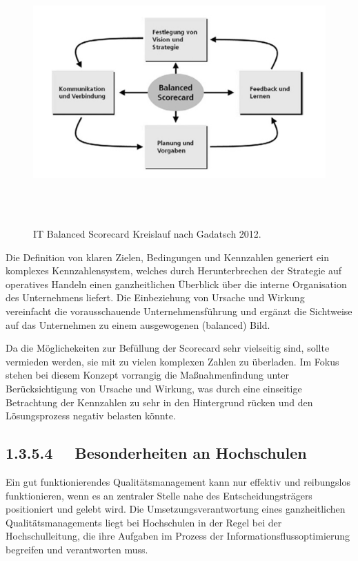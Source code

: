 \documentclass[a4paper]{article}
\begin{document}
\begin{figure}
\centering
\includegraphics[width=15.502cm,height=10.145cm]{miriamkapitel135136-img/miriamkapitel135136-img002.jpg}
\caption[IT Balanced Scorecard Kreislauf nach Gadatsch 2012.]{IT Balanced Scorecard Kreislauf nach Gadatsch 2012.}

\end{figure}
{\sffamily
Die Definition von klaren Zielen, Bedingungen und Kennzahlen generiert ein komplexes Kennzahlensystem, welches durch
Herunterbrechen der Strategie auf operatives Handeln einen ganzheitlichen Überblick über die interne Organisation des
Unternehmens liefert. Die Einbeziehung von Ursache und Wirkung vereinfacht die vorausschauende Unternehmensführung und
ergänzt die Sichtweise auf das Unternehmen zu einem ausgewogenen (balanced) Bild. }


\bigskip

{\sffamily
Da die Möglichekeiten zur Befüllung der Scorecard sehr vielseitig sind, sollte vermieden werden, sie mit zu vielen
komplexen Zahlen zu überladen. Im Fokus stehen bei diesem Konzept vorrangig die Maßnahmenfindung unter Berücksichtigung
von Ursache und Wirkung, was durch eine einseitige Betrachtung der Kennzahlen zu sehr in den Hintergrund rücken und den
Lösungsprozess negativ belasten könnte.}

\subsection[1.3.5.4 \ \ Besonderheiten an Hochschulen]{1.3.5.4 \ \ Besonderheiten an Hochschulen}
{\sffamily
Ein gut funktionierendes Qualitätsmanagement kann nur effektiv und reibungslos funktionieren, wenn es an zentraler
Stelle nahe des Entscheidungsträgers positioniert und gelebt wird. Die Umsetzungsverantwortung eines ganzheitlichen
Qualitätsmanagements liegt bei Hochschulen in der Regel bei der Hochschulleitung, die ihre Aufgaben im Prozess der
Informationsflussoptimierung begreifen und verantworten muss. }
\end{document}
